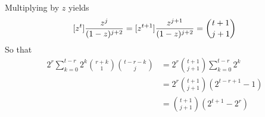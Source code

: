 Multiplying by $z$ yields
\begin{align*}
    [z^{t}] \frac{z^j}{(1-z)^{j+2}} = [z^{t+1}] \frac{z^{j+1}}{(1-z)^{j+2}} = \binom{t+1}{j+1}
\end{align*}
So that
\begin{align*}
    2^r \sum_{k=0}^{t-r} 2^{k} \binom{r+k}{1} \binom{t-r-k}{j} &= 2^r \binom{t+1}{j+1} \sum_{k=0}^{t-r} 2^{k} \\
    &= 2^r \binom{t+1}{j+1} (2^{t-r+1} - 1) \\
    &= \binom{t+1}{j+1} (2^{t+1} - 2^r) \\
\end{align*}



\clearpage
